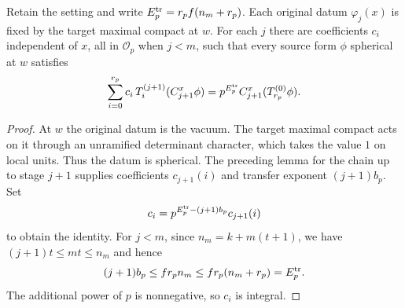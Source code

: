 \begin{lemma}
\label{lem:a-single-mark-hecke-transfer}
\emitthmsource
Retain the setting and write $E_p^{\rm tr}=r_pf(n_m+r_p)$. Each original datum $\varphi_j(x)$ is fixed by the target maximal compact at $w$. For each $j$ there are coefficients $c_i$ independent of $x$, all in $\mathcal O_p$ when $j<m$, such that every source form $\phi$ spherical at $w$ satisfies
\[
 \sum_{i=0}^{r_p} c_i\,T_i^{(j+1)}(C_{j+1}^x\phi)
    =p^{E_p^{\rm tr}} C_{j+1}^x(T_{r_p}^{(0)}\phi).
\]
\end{lemma}
\begin{proof}
At $w$ the original datum is the vacuum. The target maximal compact acts on it through an unramified determinant character, which takes the value $1$ on local units. Thus the datum is spherical. The preceding lemma for the chain up to stage $j+1$ supplies coefficients $c_{j+1}(i)$ and transfer exponent $(j+1)b_p$. Set
\[
 c_i=p^{E_p^{\rm tr}-(j+1)b_p}c_{j+1}(i)
\]
to obtain the identity. For $j<m$, since $n_m=k+m(t+1)$, we have $(j+1)t\le mt\le n_m$ and hence
\[
 (j+1)b_p\le fr_p n_m\le fr_p(n_m+r_p)=E_p^{\rm tr}.
\]
The additional power of $p$ is nonnegative, so $c_i$ is integral.
\end{proof}

